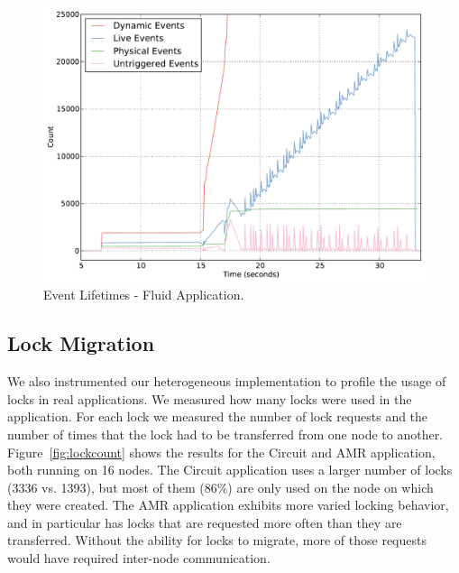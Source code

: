 \begin{figure}
\begin{center}
\includegraphics[scale=0.33]{figs/event_lifetimes.pdf}
\end{center}
\vspace{-6mm}
\caption{Event Lifetimes - Fluid Application.\label{fig:eventlife}}
\vspace{-4mm}
\end{figure}


\subsection{Lock Migration}
\label{subsec:lockmig}

We also instrumented our heterogeneous implementation to profile the usage of 
locks in real applications.  We measured how many locks were used in the application.  For
each lock we measured the number of lock requests and the number of times that the lock
had to be transferred from one node to another.  Figure~\ref{fig:lockcount} shows the results 
for the Circuit and AMR application, both running on 16 nodes.  The Circuit application uses
a larger number of locks (3336 vs. 1393), but most of them (86\%) are only used on the node on 
which they were created.  The AMR application exhibits more varied locking behavior, and in 
particular has locks that are requested more often than they are transferred.  Without the ability
for locks to migrate, more of those requests would have required inter-node communication.

